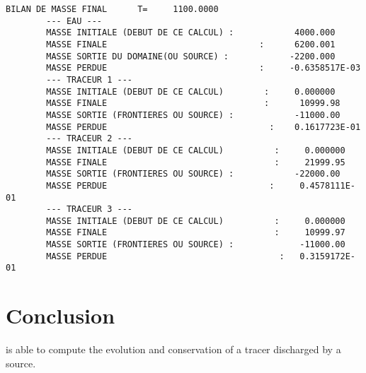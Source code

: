 \begin{lstlisting}[language=TelFortran]
        BILAN DE MASSE FINAL      T=     1100.0000
        --- EAU ---
        MASSE INITIALE (DEBUT DE CE CALCUL) :            4000.000
        MASSE FINALE                              :      6200.001
        MASSE SORTIE DU DOMAINE(OU SOURCE) :            -2200.000
        MASSE PERDUE                              :     -0.6358517E-03
        --- TRACEUR 1 ---
        MASSE INITIALE (DEBUT DE CE CALCUL)        :     0.000000
        MASSE FINALE                               :      10999.98
        MASSE SORTIE (FRONTIERES OU SOURCE) :            -11000.00
        MASSE PERDUE                                :    0.1617723E-01
        --- TRACEUR 2 ---
        MASSE INITIALE (DEBUT DE CE CALCUL)          :     0.000000
        MASSE FINALE                                 :     21999.95
        MASSE SORTIE (FRONTIERES OU SOURCE) :            -22000.00
        MASSE PERDUE                                :     0.4578111E-01
        --- TRACEUR 3 ---
        MASSE INITIALE (DEBUT DE CE CALCUL)          :     0.000000
        MASSE FINALE                                 :     10999.97
        MASSE SORTIE (FRONTIERES OU SOURCE) :             -11000.00
        MASSE PERDUE                                  :   0.3159172E-01
\end{lstlisting}
%
\section{Conclusion}
%
 is able to compute the evolution and conservation of a
tracer discharged by a source.
%
%
